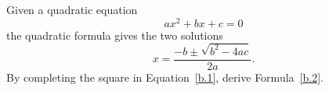 \documentclass[12pt]{amsart}
\begin{document}
\newpage

\begin{thm}[Bonus]
  Given a quadratic equation
  \begin{equation}\label{b.1}
    ax^2 + bx + c = 0
  \end{equation}
  the quadratic formula gives the two solutions
  \begin{equation}\label{b.2}
    x = \frac{-b \pm \sqrt{b^2 - 4ac}}{2a}.
  \end{equation}
  By completing the square in Equation~\eqref{b.1}, derive Formula~\eqref{b.2}.
\end{thm}
\end{document}
